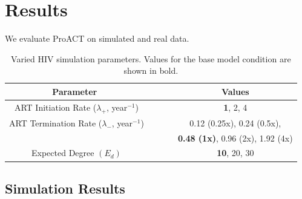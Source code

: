 \documentclass[a4paper,10pt]{article}
\begin{document}

\section{Results}
We evaluate ProACT on simulated and real data. 

\begin{table}[!t]
\begin{center}
\begin{tabular}{c c}
\toprule
\textbf{Parameter~~~~~~} & \textbf{Values}\\
\toprule
ART Initiation Rate ($\lambda_+$, year$^{-1}$)~~~~~~ & \textbf{1}, 2, 4\\
\hdashline
ART Termination Rate ($\lambda_-$, year$^{-1}$)~~~~~~ & 0.12 (0.25x), 0.24 (0.5x),\\
~~~~~~ & \textbf{0.48 (1x)}, 0.96 (2x), 1.92 (4x)\\
\hdashline
Expected Degree $\left(E_d\right)$~~~~~~ & \textbf{10}, 20, 30\\
\bottomrule
\end{tabular}
\end{center}
\caption{Varied HIV simulation parameters. Values for the base model condition are shown in bold.}
\label{tab:favites}
\end{table}

\subsection{Simulation Results}
\end{document}
